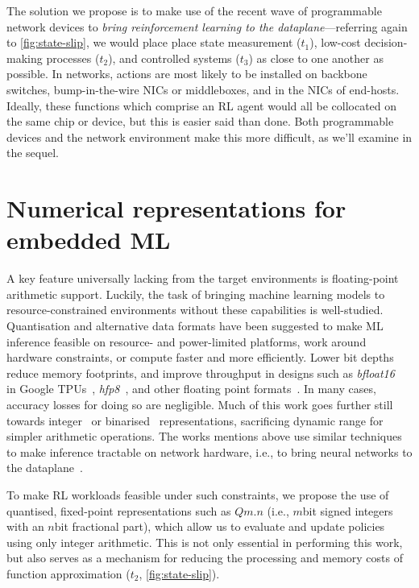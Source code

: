 
The solution we propose is to make use of the recent wave of programmable network devices to \emph{bring reinforcement learning to the dataplane}---referring again to \cref{fig:state-slip}, we would place place state measurement ($t_1$), low-cost decision-making processes ($t_2$), and controlled systems ($t_3$) as close to one another as possible.
In networks, actions are most likely to be installed on backbone switches, bump-in-the-wire NICs or middleboxes, and in the NICs of end-hosts.
Ideally, these functions which comprise an RL agent would all be collocated on the same chip or device, but this is easier said than done. 
Both programmable devices and the network environment make this more difficult, as we'll examine in the sequel.

\section{Numerical representations for embedded ML}
A key feature universally lacking from the target environments is floating-point arithmetic support.
Luckily, the task of bringing machine learning models to resource-constrained environments without these capabilities is well-studied.
Quantisation and alternative data formats have been suggested to make ML inference feasible on resource- and power-limited platforms, work around hardware constraints, or compute faster and more efficiently.
Lower bit depths reduce memory footprints, and improve throughput in designs such as \emph{bfloat16}~\parencite{bfloat16-blog} in Google TPUs~\parencite{DBLP:journals/sigops/XieDMKVZT18}, \emph{hfp8}~\parencite{DBLP:conf/nips/SunCCWVSCZG19}, and other floating point formats~\parencite{DBLP:journals/corr/abs-2007-01530}.
In many cases, accuracy losses for doing so are negligible.
Much of this work goes further still towards integer~\parencite{tensorrt-8bit} or binarised~\parencite{DBLP:journals/corr/MiyashitaLM16,DBLP:conf/eccv/RastegariORF16,DBLP:journals/corr/KimS16,DBLP:conf/nips/HubaraCSEB16} representations, sacrificing dynamic range for simpler arithmetic operations.
The works mentions above use similar techniques to make inference tractable on network hardware, i.e., to bring neural networks to the dataplane~\parencite{DBLP:journals/corr/abs-2009-02353,DBLP:conf/sigcomm/SanvitoSB18,DBLP:journals/corr/abs-1801-05731}.

To make RL workloads feasible under such constraints, we propose the use of quantised, fixed-point representations such as $Qm.n$ (i.e., $m$\si{bit} signed integers with an $n$\si{bit} fractional part), which allow us to evaluate and update policies using only integer arithmetic.
This is not only essential in performing this work, but also serves as a mechanism for reducing the processing and memory costs of function approximation ($t_2$, \cref{fig:state-slip}).

